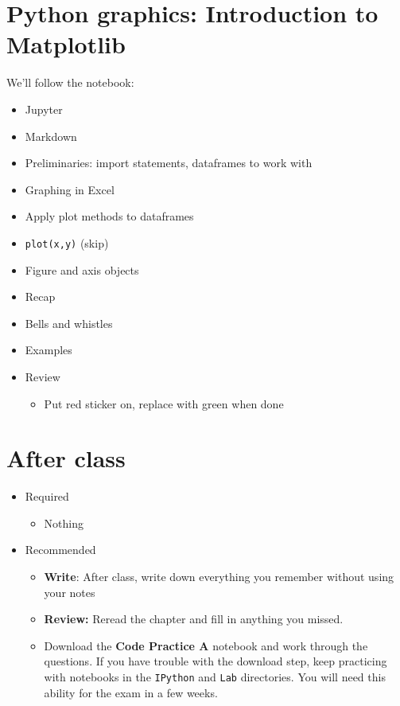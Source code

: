 \documentclass[11pt]{article}
\begin{document}
\section*{Python graphics:  Introduction to Matplotlib}

We'll follow the notebook:
\begin{itemize}
\item Jupyter
\item Markdown
\item Preliminaries:  import statements, dataframes to work with
\item Graphing in Excel
\item Apply plot methods to dataframes
\item {\tt plot(x,y)} (skip)
\item Figure and axis objects
\item Recap
\item Bells and whistles
\item Examples
\item Review
\begin{itemize}
\item Put red sticker on, replace with green when done
\end{itemize}
\end{itemize}


\begin{comment}
\section*{Examples}

If time permits, we'll go through some examples of economic and financial data
and its properties.  It's an IPython notebook that you can view on the GitHub repo:
the \verb|Code/IPython| directory,
file \verb|bootcamp_examples.ipynb|.
\end{comment}

\section*{After class}

\begin{itemize}
\item Required
\begin{itemize}
\item Nothing
\end{itemize}
\item Recommended
\begin{itemize}
\item {\bf Write}:  After class, write down everything you remember without using your notes
\item {\bf Review:} Reread the chapter and fill in anything you missed.
\item Download the {\bf Code Practice A} notebook and work through the questions.
If you have trouble with the download step, keep practicing with notebooks
in the {\tt IPython} and {\tt Lab} directories.
You will need this ability for the exam in a few weeks.
\end{itemize}
\end{itemize}


\end{document}
